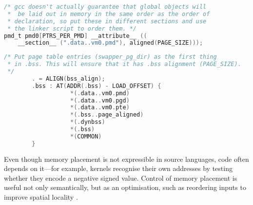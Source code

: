 {\scriptsize\begin{lstlisting}[language=C,columns=flexible,basicstyle=\sffamily]
/* gcc doesn't actually guarantee that global objects will
 *  be laid out in memory in the same order as the order of 
 * declaration, so put these in different sections and use
 * the linker script to order them. */
pmd_t pmd0[PTRS_PER_PMD] __attribute__ ((
    __section__ (".data..vm0.pmd"), aligned(PAGE_SIZE)));
\end{lstlisting}}

{\scriptsize\begin{lstlisting}[language=C,columns=flexible,basicstyle=\sffamily]
/* Put page table entries (swapper_pg_dir) as the first thing 
 * in .bss. This will ensure that it has .bss alignment (PAGE_SIZE).
 */
        . = ALIGN(bss_align);                
        .bss : AT(ADDR(.bss) - LOAD_OFFSET) {
                   *(.data..vm0.pmd)
                   *(.data..vm0.pgd)
                   *(.data..vm0.pte)
                   *(.bss..page_aligned)     
                   *(.dynbss)                
                   *(.bss)                   
                   *(COMMON)                 
        }
\end{lstlisting}}

Even though memory placement is not expressible in source languages, 
code often depends on it---for example, kernels recognise their own addresses
by testing whether they encode a negative signed value.
Control of memory placement is useful not only semantically, 
but as an optimisation, such as 
reordering inputs to improve spatial locality \citep{orr_dynamic_1994}.


